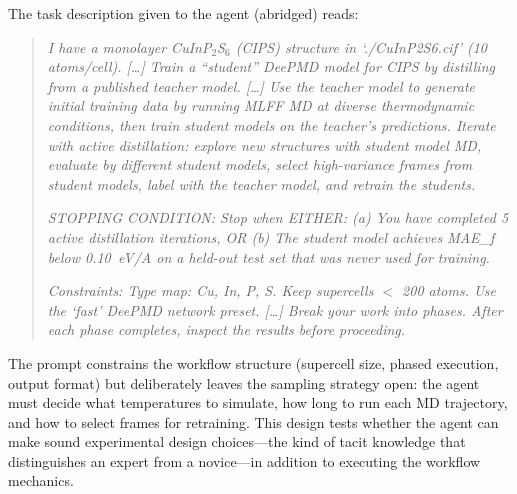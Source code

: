 \documentclass{article}
\begin{document}
The task description given to the agent (abridged) reads:

\begin{quote}
\small
\textit{I have a monolayer CuInP$_2$S$_6$ (CIPS) structure in `./CuInP2S6.cif' (10 atoms/cell). [\ldots] Train a ``student'' DeePMD model for CIPS by distilling from a published teacher model. [\ldots] Use the teacher model to generate initial training data by running MLFF MD at diverse thermodynamic conditions, then train student models on the teacher's predictions. Iterate with active distillation: explore new structures with student model MD, evaluate by different student models, select high-variance frames from student models, label with the teacher model, and retrain the students.}

\textit{STOPPING CONDITION: Stop when EITHER: (a) You have completed 5 active distillation iterations, OR (b) The student model achieves MAE\_f below 0.10~eV/A on a held-out test set that was never used for training.}

\textit{Constraints: Type map: Cu, In, P, S. Keep supercells $<$ 200 atoms. Use the `fast' DeePMD network preset. [\ldots] Break your work into phases. After each phase completes, inspect the results before proceeding.}
\end{quote}

The prompt constrains the workflow structure (supercell size, phased execution, output format) but deliberately leaves the sampling strategy open: the agent must decide what temperatures to simulate, how long to run each MD trajectory, and how to select frames for retraining.
This design tests whether the agent can make sound experimental design choices---the kind of tacit knowledge that distinguishes an expert from a novice---in addition to executing the workflow mechanics.
\end{document}
